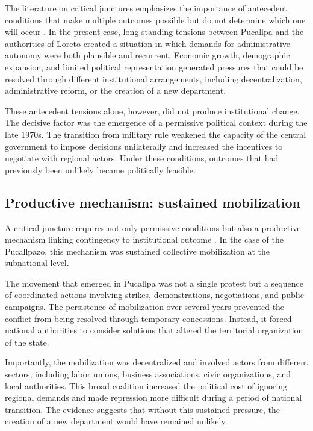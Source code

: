 \documentclass[12pt]{article}
\begin{document}
The literature on critical junctures emphasizes the importance of
antecedent conditions that make multiple outcomes possible but do not
determine which one will occur \autocite{slater_informative_2010}. In the
present case, long-standing tensions between Pucallpa and the authorities
of Loreto created a situation in which demands for administrative
autonomy were both plausible and recurrent. Economic growth, demographic
expansion, and limited political representation generated pressures that
could be resolved through different institutional arrangements, including
decentralization, administrative reform, or the creation of a new
department.

These antecedent tensions alone, however, did not produce institutional
change. The decisive factor was the emergence of a permissive political
context during the late 1970s. The transition from military rule weakened
the capacity of the central government to impose decisions unilaterally
and increased the incentives to negotiate with regional actors. Under
these conditions, outcomes that had previously been unlikely became
politically feasible.

\subsection*{Productive mechanism: sustained mobilization}

A critical juncture requires not only permissive conditions but also a
productive mechanism linking contingency to institutional outcome
\autocite{capoccia_study_2007}. In the case of the Pucallpazo, this
mechanism was sustained collective mobilization at the subnational level.

The movement that emerged in Pucallpa was not a single protest but a
sequence of coordinated actions involving strikes, demonstrations,
negotiations, and public campaigns. The persistence of mobilization over
several years prevented the conflict from being resolved through
temporary concessions. Instead, it forced national authorities to
consider solutions that altered the territorial organization of the
state.

Importantly, the mobilization was decentralized and involved actors from
different sectors, including labor unions, business associations, civic
organizations, and local authorities. This broad coalition increased the
political cost of ignoring regional demands and made repression more
difficult during a period of national transition. The evidence suggests
that without this sustained pressure, the creation of a new department
would have remained unlikely.
\end{document}
